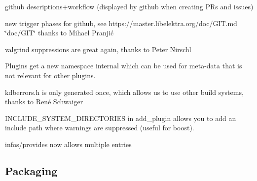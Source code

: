 \begin{DoxyItemize}
\item github descriptions+workflow (displayed by github when creating P\+Rs and issues)
\item new trigger phases for github, see https\+://master.libelektra.\+org/doc/\+G\+IT.md \char`\"{}doc/\+G\+I\+T\char`\"{} thanks to Mihael Pranjić
\item valgrind suppressions are great again, thanks to Peter Nirschl
\item Plugins get a new namespace {\ttfamily internal} which can be used for meta-\/data that is not relevant for other plugins.
\item kdberrors.\+h is only generated once, which allows us to use other build systems, thanks to René Schwaiger
\item {\ttfamily I\+N\+C\+L\+U\+D\+E\+\_\+\+S\+Y\+S\+T\+E\+M\+\_\+\+D\+I\+R\+E\+C\+T\+O\+R\+I\+ES} in add\+\_\+plugin allows you to add an include path where warnings are suppressed (useful for boost).
\item {\ttfamily infos/provides} now allows multiple entries
\end{DoxyItemize}

\subsection*{Packaging}


